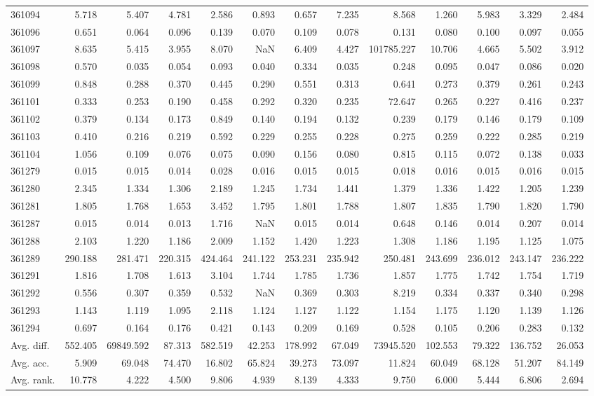 \begin{tabular}{lrrrrrrrrrrrr}
361094 & 5.718 & 5.407 & 4.781 & 2.586 & 0.893 & 0.657 & 7.235 & 8.568 & 1.260 & 5.983 & 3.329 & 2.484 \\
361096 & 0.651 & 0.064 & 0.096 & 0.139 & 0.070 & 0.109 & 0.078 & 0.131 & 0.080 & 0.100 & 0.097 & 0.055 \\
361097 & 8.635 & 5.415 & 3.955 & 8.070 & NaN & 6.409 & 4.427 & 101785.227 & 10.706 & 4.665 & 5.502 & 3.912 \\
361098 & 0.570 & 0.035 & 0.054 & 0.093 & 0.040 & 0.334 & 0.035 & 0.248 & 0.095 & 0.047 & 0.086 & 0.020 \\
361099 & 0.848 & 0.288 & 0.370 & 0.445 & 0.290 & 0.551 & 0.313 & 0.641 & 0.273 & 0.379 & 0.261 & 0.243 \\
361101 & 0.333 & 0.253 & 0.190 & 0.458 & 0.292 & 0.320 & 0.235 & 72.647 & 0.265 & 0.227 & 0.416 & 0.237 \\
361102 & 0.379 & 0.134 & 0.173 & 0.849 & 0.140 & 0.194 & 0.132 & 0.239 & 0.179 & 0.146 & 0.179 & 0.109 \\
361103 & 0.410 & 0.216 & 0.219 & 0.592 & 0.229 & 0.255 & 0.228 & 0.275 & 0.259 & 0.222 & 0.285 & 0.219 \\
361104 & 1.056 & 0.109 & 0.076 & 0.075 & 0.090 & 0.156 & 0.080 & 0.815 & 0.115 & 0.072 & 0.138 & 0.033 \\
361279 & 0.015 & 0.015 & 0.014 & 0.028 & 0.016 & 0.015 & 0.015 & 0.018 & 0.016 & 0.015 & 0.016 & 0.015 \\
361280 & 2.345 & 1.334 & 1.306 & 2.189 & 1.245 & 1.734 & 1.441 & 1.379 & 1.336 & 1.422 & 1.205 & 1.239 \\
361281 & 1.805 & 1.768 & 1.653 & 3.452 & 1.795 & 1.801 & 1.788 & 1.807 & 1.835 & 1.790 & 1.820 & 1.790 \\
361287 & 0.015 & 0.014 & 0.013 & 1.716 & NaN & 0.015 & 0.014 & 0.648 & 0.146 & 0.014 & 0.207 & 0.014 \\
361288 & 2.103 & 1.220 & 1.186 & 2.009 & 1.152 & 1.420 & 1.223 & 1.308 & 1.186 & 1.195 & 1.125 & 1.075 \\
361289 & 290.188 & 281.471 & 220.315 & 424.464 & 241.122 & 253.231 & 235.942 & 250.481 & 243.699 & 236.012 & 243.147 & 236.222 \\
361291 & 1.816 & 1.708 & 1.613 & 3.104 & 1.744 & 1.785 & 1.736 & 1.857 & 1.775 & 1.742 & 1.754 & 1.719 \\
361292 & 0.556 & 0.307 & 0.359 & 0.532 & NaN & 0.369 & 0.303 & 8.219 & 0.334 & 0.337 & 0.340 & 0.298 \\
361293 & 1.143 & 1.119 & 1.095 & 2.118 & 1.124 & 1.127 & 1.122 & 1.154 & 1.175 & 1.120 & 1.139 & 1.126 \\
361294 & 0.697 & 0.164 & 0.176 & 0.421 & 0.143 & 0.209 & 0.169 & 0.528 & 0.105 & 0.206 & 0.283 & 0.132 \\
Avg. diff. & 552.405 & 69849.592 & 87.313 & 582.519 & 42.253 & 178.992 & 67.049 & 73945.520 & 102.553 & 79.322 & 136.752 & 26.053 \\
Avg. acc. & 5.909 & 69.048 & 74.470 & 16.802 & 65.824 & 39.273 & 73.097 & 11.824 & 60.049 & 68.128 & 51.207 & 84.149 \\
Avg. rank. & 10.778 & 4.222 & 4.500 & 9.806 & 4.939 & 8.139 & 4.333 & 9.750 & 6.000 & 5.444 & 6.806 & 2.694 \\
\bottomrule
\end{tabular}
